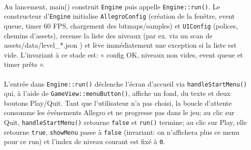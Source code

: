\documentclass[12pt]{article}
\begin{document}
\paragraph{}
Au lancement, main()  construit \colorbox{gray!20}{\texttt{Engine}} puis appelle \colorbox{gray!20}{\texttt{Engine::run()}}. Le constructeur d’\colorbox{gray!20}{\texttt{Engine}} initialise \colorbox{gray!20}{\texttt{AllegroConfig}} (création de la fenêtre, event queue, timer 60 FPS, chargement des bitmaps/samples) et \colorbox{gray!20}{\texttt{UIConfig}} (polices, chemins d’assets), recense la liste des niveaux (par ex. via un scan de  assets/data/level\_*.json ) et lève immédiatement une exception si la liste est vide. L’invariant à ce stade est: « config OK, niveaux non vides, event queue et timer prêts ». 

\paragraph{}
L’entrée dans \colorbox{gray!20}{\texttt{Engine::run()}} déclenche l’écran d’accueil via \colorbox{gray!20}{\texttt{handleStartMenu()}} qui, à l’aide de \colorbox{gray!20}{\texttt{GameView::menuButton()}}, affiche un fond, du texte et deux boutons Play/Quit. Tant que l’utilisateur n’a pas choisi, la boucle d’attente consomme les événements Allegro et ne progresse pas dans le jeu; au clic sur Quit, \colorbox{gray!20}{\texttt{handleStartMenu()}} retourne \texttt{false} et \colorbox{gray!20}{\texttt{run()}} termine; au clic sur Play, elle retourne \texttt{true}, \texttt{showMenu} passe à \texttt{false} (invariant: on n’affichera plus ce menu pour ce run) et l’index de niveau courant est fixé à \texttt{0}. 
\paragraph{}
\end{document}
